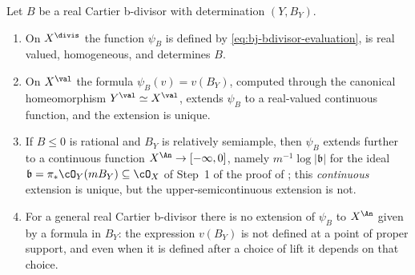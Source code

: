 \begin{proposition}
\label{prop:ch38-evaluation-domains}
Let $B$ be a real Cartier b-divisor with determination $(Y,B_Y)$.
\begin{enumerate}
\item\label{itm:ch38-dom:divis} On $X^{\divis}$ the function
 $\psi_B$ is defined by \eqref{eq:bj-bdivisor-evaluation}, is real
 valued, homogeneous, and determines $B$.
\item\label{itm:ch38-dom:val} On $X^{\val}$ the formula
 $\psi_B(v)=v(B_Y)$, computed through the canonical homeomorphism
 $Y^{\val}\simeq X^{\val}$, extends $\psi_B$ to a real-valued
 continuous function, and the extension is unique.
\item\label{itm:ch38-dom:an} If $B\leq0$ is rational and $B_Y$ is
 relatively semiample, then $\psi_B$ extends further to a
 continuous function
 $X^{\An}\to[-\infty,0]$, namely $m^{-1}\log|\mathfrak b|$ for the
 ideal $\mathfrak b=\pi_*\cO_Y(mB_Y)\subseteq\cO_X$ of Step~1 of the
 proof of ; this \emph{continuous}
 extension is unique, but the upper-semicontinuous extension is not.
\item\label{itm:ch38-dom:general} For a general real Cartier b-divisor
 there is no extension of $\psi_B$ to $X^{\An}$ given by a formula in
 $B_Y$: the expression $v(B_Y)$ is not defined at a point of proper
 support, and even when it is defined after a choice of lift it depends on
 that choice.
\end{enumerate}
\end{proposition}

